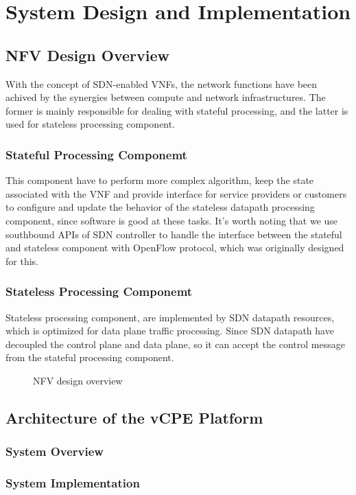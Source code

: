 \section{System Design and Implementation}
\subsection{NFV Design Overview}
With the concept of SDN-enabled VNFs, the network functions have been achived by the synergies between compute and network infrastructures. The former is mainly responsible for dealing with stateful processing, and the latter is used for stateless processing component.

\subsubsection{Stateful Processing Componemt}
This component have to perform more complex algorithm, keep the state associated with the VNF and provide interface for service providers or customers to configure and update the behavior of the stateless datapath processing component, since software is good at these tasks. It's worth noting that we use southbound APIs of SDN controller to handle the interface between the stateful and stateless component with OpenFlow protocol, which was originally designed for this.

\subsubsection{Stateless Processing Componemt}
Stateless processing component, are implemented by SDN datapath resources, which is optimized for data plane traffic processing. Since SDN datapath have decoupled the control plane and data plane, so it can accept the control message from the stateful processing component.

\begin{figure}
  \centering
  \def\svgwidth{\linewidth}
  
  \caption{NFV design overview}
  \label{fig:fw_design}
\end{figure}

\subsection{Architecture of the vCPE Platform}

\subsubsection{System Overview}
\subsubsection{System Implementation}
